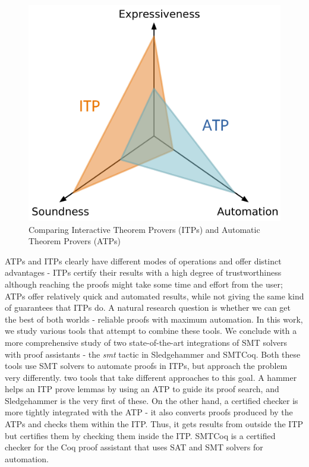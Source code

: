 \documentclass{article}
\begin{document}
	\begin{figure}[t]
		\centering
		\includegraphics[scale=0.5]{coq.pdf}
		\caption{Comparing Interactive Theorem Provers (ITPs)
		and Automatic Theorem Provers (ATPs)}
		\label{fig:graph}
	\end{figure}

	ATPs and ITPs clearly have different modes of operations
	and offer distinct advantages - ITPs certify their 
	results with a high degree of trustworthiness although 
	reaching the proofs might take some time and effort from 
	the user; ATPs offer relatively quick and automated results, 
	while not giving the same kind of guarantees that ITPs do.
	A natural research question is whether we can get the best 
	of both worlds - reliable proofs with maximum automation. 
	In this work, we study various tools that 
	attempt to combine these tools. We conclude with a 
	more comprehensive study of two state-of-the-art
	integrations of SMT solvers with proof assistants -
	the \textit{smt} tactic in Sledgehammer and 
	SMTCoq. Both these tools use SMT solvers to 
	automate proofs in ITPs, but approach the 
	problem very differently. 
	two tools that take different approaches 
	to this goal. A hammer helps an ITP prove lemmas by using 
	an ATP to guide its proof search, and Sledgehammer is
	the very first of these. On the other hand, 
	a certified checker is more tightly integrated with the ATP 
	- it also converts proofs produced by the ATPs and 
	checks them within the ITP. Thus, it gets results 
	from outside the ITP but certifies them by checking them
	inside the ITP. SMTCoq is a certified checker 
	for the Coq proof assistant that uses SAT and SMT solvers
	for automation.
\end{document}
